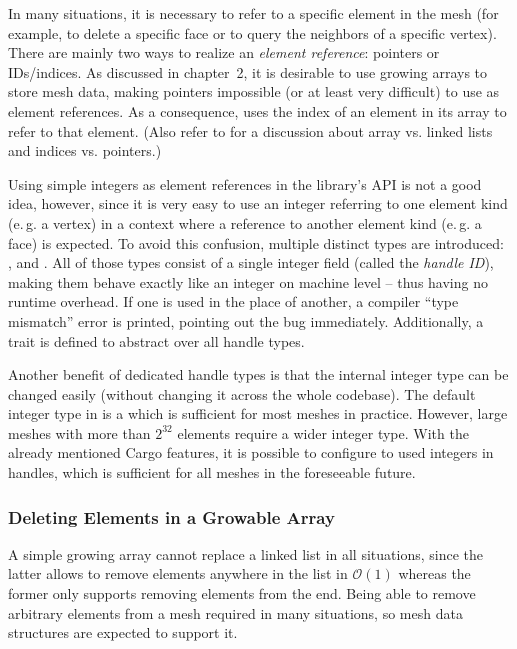In many situations, it is necessary to refer to a specific element in the mesh (for example, to delete a specific face or to query the neighbors of a specific vertex).
There are mainly two ways to realize an \emph{element reference}: pointers or IDs/indices.
As discussed in chapter~2, it is desirable to use growing arrays to store mesh data, making pointers impossible (or at least very difficult) to use as element references.
As a consequence,  uses the index of an element in its array to refer to that element.
(Also refer to \cite{sieger2011design} for a discussion about array vs. linked lists and indices vs. pointers.)

Using simple integers as element references in the library's API is not a good idea, however, since it is very easy to use an integer referring to one element kind (e.\,g. a vertex) in a context where a reference to another element kind (e.\,g. a face) is expected.
To avoid this confusion, multiple distinct types are introduced: ,  and .
All of those types consist of a single integer field (called the \emph{handle ID}), making them behave exactly like an integer on machine level -- thus having no runtime overhead.
If one is used in the place of another, a compiler \enquote{type mismatch} error is printed, pointing out the bug immediately.
Additionally, a  trait is defined to abstract over all handle types.

Another benefit of dedicated handle types is that the internal integer type can be changed easily (without changing it across the whole codebase).
The default integer type in  is a  which is sufficient for most meshes in practice.
However, large meshes with more than $2^{32}$ elements require a wider integer type.
With the already mentioned Cargo features, it is possible to configure  to used  integers in handles, which is sufficient for all meshes in the foreseeable future.


\subsubsection*{Deleting Elements in a Growable Array}

A simple growing array cannot replace a linked list in all situations, since the latter allows to remove elements anywhere in the list in $\mathcal O(1)$ whereas the former only supports removing elements from the end.
Being able to remove arbitrary elements from a mesh required in many situations, so mesh data structures are expected to support it.

